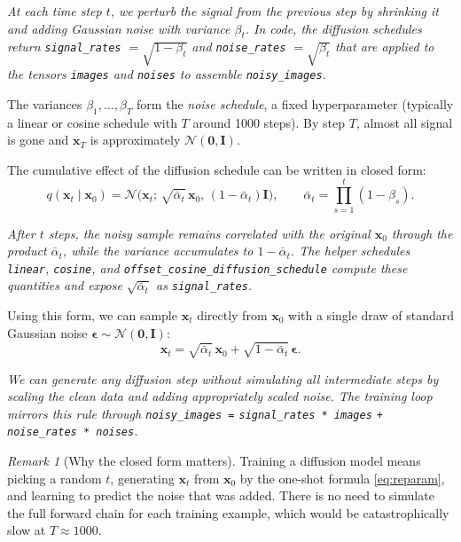 \documentclass[11pt]{article}
\theoremstyle{remark}
\newtheorem*{remark}{Remark}
\begin{document}
\textit{At each time step $t$, we perturb the signal from the previous step by shrinking it and adding Gaussian noise with variance $\beta_t$. In code, the diffusion schedules return \texttt{signal\_rates} $= \sqrt{1-\beta_t}$ and \texttt{noise\_rates} $= \sqrt{\beta_t}$ that are applied to the tensors \texttt{images} and \texttt{noises} to assemble \texttt{noisy\_images}.}

The variances $\beta_1, \dots, \beta_T$ form the \emph{noise schedule}, a fixed hyperparameter (typically a linear or cosine schedule with $T$ around 1000 steps). By step $T$, almost all signal is gone and $\mathbf{x}_T$ is approximately $\mathcal{N}(\mathbf{0}, \mathbf{I})$.

The cumulative effect of the diffusion schedule can be written in closed form:
\begin{equation}
q(\mathbf{x}_t \mid \mathbf{x}_0) = \mathcal{N}\!\Big(\mathbf{x}_t;\, \sqrt{\bar{\alpha}_t}\,\mathbf{x}_0,\, (1-\bar{\alpha}_t) \mathbf{I}\Big), \qquad \bar{\alpha}_t = \prod_{s=1}^t (1-\beta_s).
\label{eq:forward-marginal}
\end{equation}

\textit{After $t$ steps, the noisy sample remains correlated with the original $\mathbf{x}_0$ through the product $\bar{\alpha}_t$, while the variance accumulates to $1-\bar{\alpha}_t$. The helper schedules \texttt{linear}, \texttt{cosine}, and \texttt{offset\_cosine\_diffusion\_schedule} compute these quantities and expose $\sqrt{\bar{\alpha}_t}$ as \texttt{signal\_rates}.}

Using this form, we can sample $\mathbf{x}_t$ directly from $\mathbf{x}_0$ with a single draw of standard Gaussian noise $\boldsymbol{\epsilon} \sim \mathcal{N}(\mathbf{0}, \mathbf{I})$:
\begin{equation}
\mathbf{x}_t = \sqrt{\bar{\alpha}_t}\,\mathbf{x}_0 + \sqrt{1-\bar{\alpha}_t}\,\boldsymbol{\epsilon}.
\label{eq:reparam}
\end{equation}

\textit{We can generate any diffusion step without simulating all intermediate steps by scaling the clean data and adding appropriately scaled noise. The training loop mirrors this rule through \texttt{noisy\_images =} \texttt{signal\_rates * images} \texttt{+ noise\_rates * noises}.}

\begin{remark}[Why the closed form matters]
Training a diffusion model means picking a random $t$, generating $\mathbf{x}_t$ from $\mathbf{x}_0$ by the one-shot formula \eqref{eq:reparam}, and learning to predict the noise that was added. There is no need to simulate the full forward chain for each training example, which would be catastrophically slow at $T \approx 1000$.
\end{remark}
\end{document}
